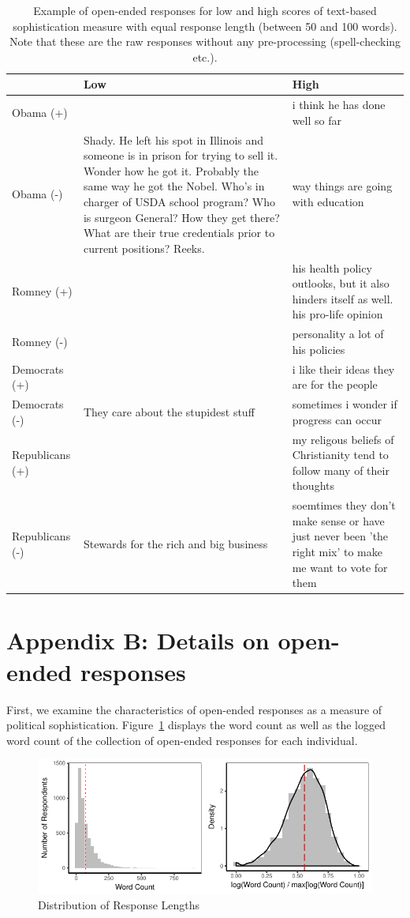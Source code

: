 \documentclass[12pt]{article}
\begin{document}
\begin{table}\footnotesize\centering
\begin{tabular}[ht]{lp{7cm}p{7cm}}
   \toprule
  & Low & High \\ 
   \midrule
   Obama (+) &  & i think he has done well so far \\ 
   Obama (-) & Shady. He left his spot in Illinois and someone is in prison for trying to sell it. Wonder how he got it. Probably the same way he got the Nobel. Who's in charger of USDA school program? Who is surgeon General? How they get there? What are their true credentials prior to current positions? Reeks. & way things are going with education \\ 
   Romney (+) &  & his health policy outlooks, but it also hinders itself as well. his pro-life opinion \\ 
   Romney (-) &  & personality a lot of his policies \\ 
   Democrats (+) &  & i like their ideas they are for the people \\ 
   Democrats (-) & They care about the stupidest stuff & sometimes i wonder if progress can occur \\ 
   Republicans (+) &  & my religous beliefs of Christianity tend to follow many of their thoughts \\ 
   Republicans (-) & Stewards for the rich and big business & soemtimes they don't make sense or have just never been 'the right mix' to make me want to vote for them \\ 
    \bottomrule
    \end{tabular}
  \caption{Example of open-ended responses for low and high scores of text-based sophistication measure with equal response length (between 50 and 100 words). Note that these are the raw responses without any pre-processing (spell-checking etc.).}
  \end{table}
  
\clearpage
\section*{Appendix B: Details on open-ended responses}

First, we examine the characteristics of open-ended responses as a measure of political sophistication. Figure~\ref{fig:wc} displays the word count as well as the logged word count of the collection of open-ended responses for each individual.

\begin{figure}[h]
\includegraphics{../fig/wc.pdf}
\caption{Distribution of Response Lengths}\label{fig:wc}
\end{figure}
\end{document}
